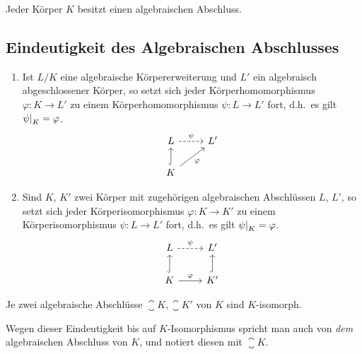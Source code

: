 \begin{theorem}
  Jeder Körper $K$ besitzt einen algebraischen Abschluss.
\end{theorem}



\subsection{Eindeutigkeit des Algebraischen Abschlusses}

\begin{lemma}
  \leavevmode
  \begin{enumerate}
    \item
      Ist $L/K$ eine algebraische Körpererweiterung und $L'$ ein algebraisch abgeschlossener Körper, so setzt sich jeder Körperhomomorphismus $\varphi \colon K \to L'$ zu einem Körperhomomorphismus $\psi \colon L \to L'$ fort, d.h.\ es gilt $\restrict{\psi}{K} = \varphi$.
      \[
        \begin{tikzcd}
            L
            \arrow[dashed]{r}[above]{\psi}
          & L'
          \\
            K
            \arrow[hook]{u}
            \arrow{ru}[below right]{\varphi}
          & {}
        \end{tikzcd}
      \]
    \item
      Sind $K$, $K'$ zwei Körper mit zugehörigen algebraischen Abschlüssen $L$, $L'$, so setzt sich jeder Körperisomorphismus $\varphi \colon K \to K'$ zu einem Körperisomorphismus $\psi \colon L \to L'$ fort, d.h.\ es gilt $\restrict{\psi}{K} = \varphi$.
      \[
        \begin{tikzcd}
            L
            \arrow[dashed]{r}[above]{\psi}
          & L'
          \\
            K
            \arrow[hook]{u}
            \arrow{r}[above]{\varphi}
          & K'
            \arrow[hook]{u}
        \end{tikzcd}
      \]
  \end{enumerate}
\end{lemma}


\begin{corollary}
  Je zwei algebraische Abschlüsse $\closure{K}, \closure{K}'$ von $K$ sind $K$-isomorph.
\end{corollary}

Wegen dieser Eindeutigkeit bis auf $K$-Isomorphismus spricht man auch von \emph{dem} algebraischen Abschluss von $K$, und notiert diesen mit $\closure{K}$.





